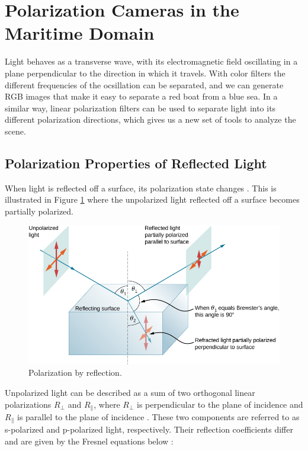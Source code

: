 \section{Polarization Cameras in the Maritime Domain}
Light behaves as a transverse wave, with its electromagnetic field oscillating in a plane perpendicular to the direction in which it travels.
With color filters the different frequencies of the ocsillation can be separated, and we can generate RGB images that make it easy to separate a red boat from a blue sea.
In a similar way, linear polarization filters can be used to separate light into its different polarization directions, which gives us a new set of tools to analyze the scene.


\subsection{Polarization Properties of Reflected Light}
When light is reflected off a surface, its polarization state changes \cite[34]{lingUniversityPhysicsVolume2016}.
This is illustrated in Figure \ref{fig:polarized_reflection} where the unpolarized light reflected off a surface becomes partially polarized.


\begin{figure}[H]
    \centering
    \includegraphics[width=.8\linewidth]{figures/polarization/reflaction.png}
    \caption{Polarization by reflection.
        \cite[Figure 1.38]{lingUniversityPhysicsVolume2016}}
    \label{fig:polarized_reflection}
\end{figure}


Unpolarized light can be described as a sum of two orthogonal linear polarizations $R_\perp$ and $R_\parallel$, where $R_\perp$ is perpendicular to the plane of incidence and $R_\parallel$ is parallel to the plane of incidence  \cite{FresnelEquations2024}.
These two components are referred to as s-polarized and p-polarized light, respectively.
Their reflection coefficients differ and are given by the Fresnel equations below \cite{FresnelEquations2024}:

